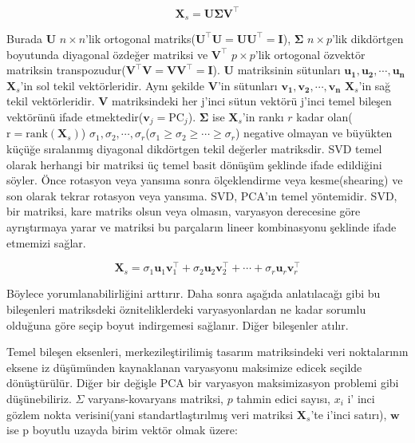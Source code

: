 \documentclass[12pt]{article}
\begin{document}
\[
  \mathbf{X}_s = \mathbf{U\Sigma V^\top}
\]

Burada $\mathbf{U}$ $n \times n$'lik ortogonal matriks($\mathbf{U}^\top\mathbf{U}=\mathbf{U}\mathbf{U}^\top=\mathbf{I}$), $\mathbf{\Sigma}$ $n \times p$'lik dikdörtgen boyutunda diyagonal özdeğer matriksi ve $\mathbf{V^\top}$ $p \times p$'lik ortogonal özvektör matriksin transpozudur($\mathbf{V}^\top\mathbf{V}=\mathbf{V}\mathbf{V}^\top=\mathbf{I}$). $\mathbf{U}$ matriksinin sütunları $\mathbf{u_1}, \mathbf{u_2}, \cdots, \mathbf{u_n}$ $\mathbf{X}_s$'in sol tekil vektörleridir. Aynı şekilde $\mathbf{V}$'in sütunları $\mathbf{v_1}, \mathbf{v_2}, \cdots, \mathbf{v_n}$ $\mathbf{X}_s$'in sağ tekil vektörleridir. $\mathbf{V}$ matriksindeki her j'inci sütun vektörü j'inci temel bileşen vektörünü ifade etmektedir($\mathbf{v}_j=\text{PC}_j$). $\mathbf{\Sigma}$ ise $\mathbf{X}_s$'in rankı $r$ kadar olan($\text{r}=\text{rank}(\mathbf{X}_s)$) $\sigma_1, \sigma_2,\cdots, \sigma_r$($\sigma_1 \ge \sigma_2 \ge \cdots \ge \sigma_r$) negative olmayan ve büyükten küçüğe sıralanmış diyagonal dikdörtgen tekil değerler matriksdir. SVD temel olarak herhangi bir matriksi üç temel basit dönüşüm şeklinde ifade edildiğini söyler. Önce rotasyon veya yansıma sonra ölçeklendirme veya kesme(shearing)  ve son olarak tekrar rotasyon veya yansıma. SVD, PCA'ın temel yöntemidir. SVD, bir matriksi, kare matriks olsun veya olmasın, varyasyon derecesine göre ayrıştırmaya yarar ve matriksi bu parçaların lineer kombinasyonu şeklinde ifade etmemizi sağlar.

\[
\mathbf{X}_s = \sigma_1 \mathbf{u}_1 \mathbf{v}_1^\top
  + \sigma_2 \mathbf{u}_2 \mathbf{v}_2^\top
  + \cdots
  + \sigma_r \mathbf{u}_r \mathbf{v}_r^\top
\]

Böylece yorumlanabilirliğini arttırır. Daha sonra aşağıda anlatılacağı gibi bu bileşenleri matriksdeki özniteliklerdeki varyasyonlardan ne kadar sorumlu olduğuna göre seçip boyut indirgemesi sağlanır. Diğer bileşenler atılır.

\vspace{1.5em}

Temel bileşen eksenleri, merkezileştirilimiş tasarım matriksindeki veri noktalarının eksene iz düşümünden kaynaklanan varyasyonu maksimize edicek seçilde dönüştürülür. Diğer bir değişle PCA bir varyasyon maksimizasyon problemi gibi düşünebiliriz. $\Sigma$ varyans-kovaryans matriksi, $p$ tahmin edici sayısı, $x_i$ i' inci gözlem nokta verisini(yani standartlaştırılmış veri matriksi $\mathbf{X}_s$'te i'inci satırı), $\mathbf{w}$ ise p boyutlu uzayda birim vektör olmak üzere:
\end{document}
